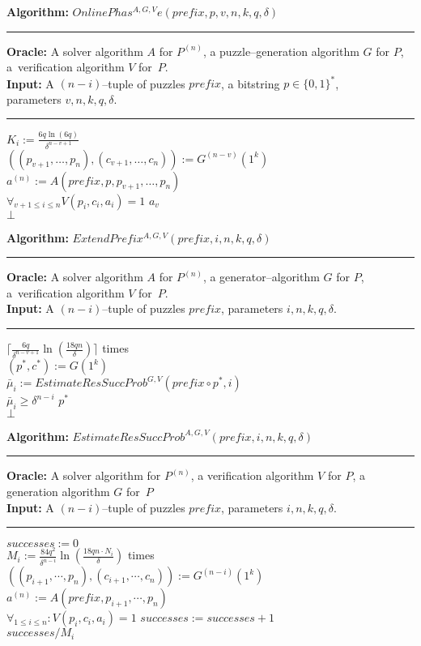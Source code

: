 \documentclass[11pt,a4paper,titlepage]{memoir}
\begin{document}
\begin{codeblock}
  \textbf{Algorithm:} $\mathit{OnlinePhas^{A, G, V}e(\mathit{prefix}, p, v, n, k, q, \delta)}$
  \medskip \hrule
  \textbf{Oracle:} A solver algorithm $A$ for $P^{(n)}$, a puzzle--generation algorithm $G$ for $P$, a~verification algorithm $V$ for~$P$.\\
  \textbf{Input:} A $(n-i)$--tuple of puzzles $\mathit{prefix}$, a bitstring $p \in \{0,1\}^{*}$, \\ parameters $v, n, k, q, \delta$.
  \medskip\hrule
  \Repeat $K_i := \frac{6q \ln (6q)}{\delta^{n-v+1}}$ \\
  \IndI $((p_{v+1}, \dotsc, p_{n}),(c_{v+1}, \dots, c_n)) := G^{(n-v)}(1^k)$\\
  \IndI $a^{(n)} := A(\mathit{prefix}, p, p_{v+1}, \dotsc, p_n)$\\
  \IndI \If $\forall_{v+1 \leq i \leq n} V(p_i, c_i, a_i) = 1$ \Then \Return $a_v$\\
  \Return $\bot$
\end{codeblock}
%
\begin{codeblock}
  \textbf{Algorithm:} $\mathit{ExtendPrefix^{A, G,V}(prefix, i, n, k, q, \delta)}$
  \medskip \hrule
  \textbf{Oracle:} A solver algorithm $A$ for $P^{(n)}$, a generator--algorithm $G$ for $P$, a~verification algorithm $V$ for~$P$.\\
  \textbf{Input:} A $(n-i)$--tuple of puzzles $\mathit{prefix}$, parameters $i, n, k, q, \delta$.
  \medskip\hrule
  \Repeat $\Big\lceil \frac{6q}{\delta^{n-v+1}} \ln (\frac{18qn}{\delta}) \Big\rceil$ times \Do \\
  \IndI $(p^*, c^*) := G(1^k) $\\
  \IndI $\bar{\mu}_i := \mathit{EstimateResSuccProb}^{G,V}(\mathit{prefix} \circ p^*, i)$\\
  \IndI \If $\bar{\mu}_i \geq \delta^{n-i}$ \Then \Return $p^*$ \\
  \Return $\bot$
\end{codeblock}
%
\begin{codeblock}
  \textbf{Algorithm:} $\mathit{EstimateResSuccProb}^{A, G,V}(\mathit{prefix}, i, n, k, q, \delta)$
  \medskip \hrule
  \textbf{Oracle:} A solver algorithm for $P^{(n)}$, a verification algorithm $V$ for $P$, a generation algorithm $G$ for~$P$\\
  \textbf{Input:} A $(n-i)$--tuple of puzzles $\mathit{prefix}$, parameters $i, n, k, q, \delta$.
  \medskip\hrule
  $successes := 0$ \\
  \Repeat $M_i := \frac{84q^2}{\delta^{n-i}} \ln(\frac{18qn \cdot N_i}{\delta})$ times \\
  \IndI $((p_{i+1}, \cdots, p_n), (c_{i+1}, \cdots, c_n)) := G^{(n-i)}(1^k)$\\
  \IndI $a^{(n)} := A(prefix, p_{i+1}, \cdots, p_{n})$\\
  \IndI \If $\forall_{1 \leq i \leq n} : V(p_i, c_i, a_i) = 1$ \Then $\mathit{successes := successes + 1}$ \\
  \Return $successes / M_i$
\end{codeblock}
\end{document}
